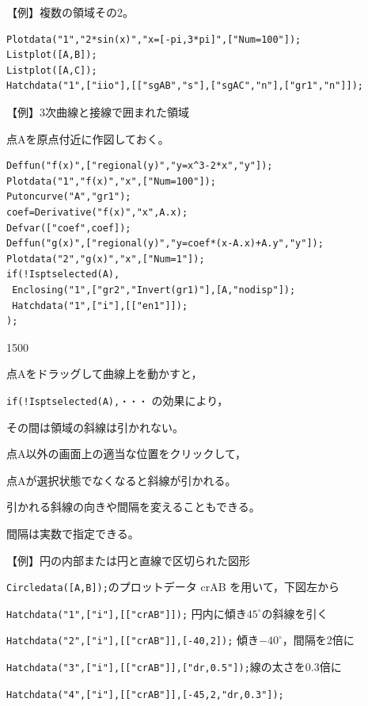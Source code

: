 \documentclass[papersize,a4paper,12pt,uplatex]{jsarticle}
\begin{document}
\begin{description}
【例】複数の領域その2。
\begin{verbatim}
Plotdata("1","2*sin(x)","x=[-pi,3*pi]",["Num=100"]);
Listplot([A,B]);
Listplot([A,C]);
Hatchdata("1",["iio"],[["sgAB","s"],["sgAC","n"],["gr1","n"]]);
\end{verbatim}
\begin{center}
\begin{center}  \end{center}
\end{center}


【例】3次曲線と接線で囲まれた領域

点Aを原点付近に作図しておく。
\begin{verbatim}
Deffun("f(x)",["regional(y)","y=x^3-2*x","y"]);
Plotdata("1","f(x)","x",["Num=100"]);
Putoncurve("A","gr1");
coef=Derivative("f(x)","x",A.x);
Defvar(["coef",coef]);
Deffun("g(x)",["regional(y)","y=coef*(x-A.x)+A.y","y"]);
Plotdata("2","g(x)","x",["Num=1"]);
if(!Isptselected(A),
 Enclosing("1",["gr2","Invert(gr1)"],[A,"nodisp"]);
 Hatchdata("1",["i"],[["en1"]]);
);

\end{verbatim}
\begin{layer}{150}{0}
\end{layer}

点Aをドラッグして曲線上を動かすと，

\verb|if(!Isptselected(A),・・・| の効果により，

その間は領域の斜線は引かれない。

点A以外の画面上の適当な位置をクリックして，

点Aが選択状態でなくなると斜線が引かれる。

引かれる斜線の向きや間隔を変えることもできる。

間隔は実数で指定できる。

\vspace{\baselineskip}
【例】円の内部または円と直線で区切られた図形

\verb|Circledata([A,B]);|のプロットデータ crAB を用いて，下図左から

\verb|Hatchdata("1",["i"],[["crAB"]]);| 円内に傾き$45^{\circ}$の斜線を引く

\verb|Hatchdata("2",["i"],[["crAB"]],[-40,2]);| 傾き$-40^{\circ}$，間隔を2倍に

\verb|Hatchdata("3",["i"],[["crAB"]],["dr,0.5"]);|線の太さを0.3倍に

\verb|Hatchdata("4",["i"],[["crAB"]],[-45,2,"dr,0.3"]);| 


\end{description}
\end{document}
